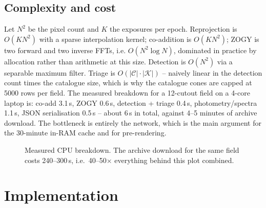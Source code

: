 \documentclass[11pt,a4paper]{article}
\begin{document}
\subsection{Complexity and cost}

Let $N^2$ be the pixel count and $K$ the exposures per epoch. Reprojection is $O(KN^2)$ with a sparse
interpolation kernel; co-addition is $O(KN^2)$; ZOGY is two forward and two inverse FFTs, i.e.
$O(N^2\log N)$, dominated in practice by allocation rather than arithmetic at this size. Detection is
$O(N^2)$ via a separable maximum filter. Triage is $O(|\mathcal{C}|\cdot|\mathcal{K}|)$ -- naively linear in
the detection count times the catalogue size, which is why the catalogue cones are capped at 5000 rows
per field. The measured breakdown for a 12-cutout field on a 4-core laptop is: co-add 3.1\,s, ZOGY
0.6\,s, detection + triage 0.4\,s, photometry/spectra 1.1\,s, JSON serialisation 0.5\,s -- about 6\,s
in total, against 4--5 minutes of archive download. The bottleneck is entirely the network, which is
the main argument for the 30-minute in-RAM cache and for pre-rendering.

\begin{figure}[H]
\centering
{}
\caption{Measured CPU breakdown. The archive download for the same field costs 240--300\,s, i.e.\
40--50$\times$ everything behind this plot combined.}
\label{fig:timing}
\end{figure}

\section{Implementation}
\label{sec:impl}
\end{document}
